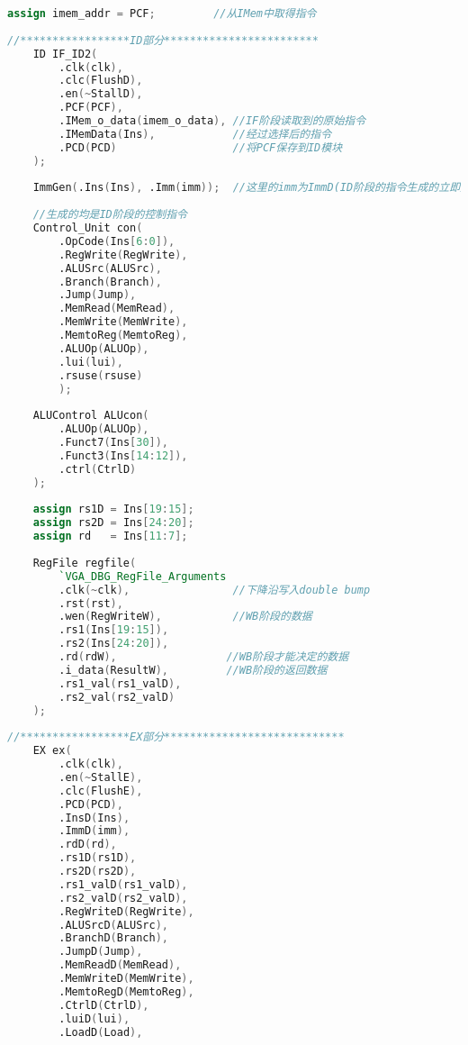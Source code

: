 \begin{lstlisting}[language = {verilog}]
    assign imem_addr = PCF;         //从IMem中取得指令 
    
//*****************ID部分************************    
    ID IF_ID2(
        .clk(clk),
        .clc(FlushD),
        .en(~StallD),
        .PCF(PCF),                  
        .IMem_o_data(imem_o_data), //IF阶段读取到的原始指令
        .IMemData(Ins),            //经过选择后的指令
        .PCD(PCD)                  //将PCF保存到ID模块
    );
    
    ImmGen(.Ins(Ins), .Imm(imm));  //这里的imm为ImmD(ID阶段的指令生成的立即数)     
    
    //生成的均是ID阶段的控制指令
    Control_Unit con(
        .OpCode(Ins[6:0]), 
        .RegWrite(RegWrite), 
        .ALUSrc(ALUSrc), 
        .Branch(Branch),
        .Jump(Jump),
        .MemRead(MemRead),
        .MemWrite(MemWrite),
        .MemtoReg(MemtoReg),
        .ALUOp(ALUOp),
        .lui(lui),
        .rsuse(rsuse)
        );
    
    ALUControl ALUcon(
        .ALUOp(ALUOp),
        .Funct7(Ins[30]),
        .Funct3(Ins[14:12]),
        .ctrl(CtrlD)
    );
    
    assign rs1D = Ins[19:15];
    assign rs2D = Ins[24:20];
    assign rd   = Ins[11:7];
    
    RegFile regfile(
        `VGA_DBG_RegFile_Arguments
        .clk(~clk),                //下降沿写入double bump
        .rst(rst),
        .wen(RegWriteW),           //WB阶段的数据
        .rs1(Ins[19:15]),
        .rs2(Ins[24:20]),
        .rd(rdW),                 //WB阶段才能决定的数据
        .i_data(ResultW),         //WB阶段的返回数据
        .rs1_val(rs1_valD),
        .rs2_val(rs2_valD)
    );
    
//*****************EX部分****************************      
    EX ex(
        .clk(clk),
        .en(~StallE),
        .clc(FlushE),
        .PCD(PCD),
        .InsD(Ins),
        .ImmD(imm),
        .rdD(rd),
        .rs1D(rs1D),
        .rs2D(rs2D),
        .rs1_valD(rs1_valD),
        .rs2_valD(rs2_valD),
        .RegWriteD(RegWrite),
        .ALUSrcD(ALUSrc),
        .BranchD(Branch),
        .JumpD(Jump),
        .MemReadD(MemRead),
        .MemWriteD(MemWrite),
        .MemtoRegD(MemtoReg),
        .CtrlD(CtrlD),
        .luiD(lui),
        .LoadD(Load),
        

\end{lstlisting}

